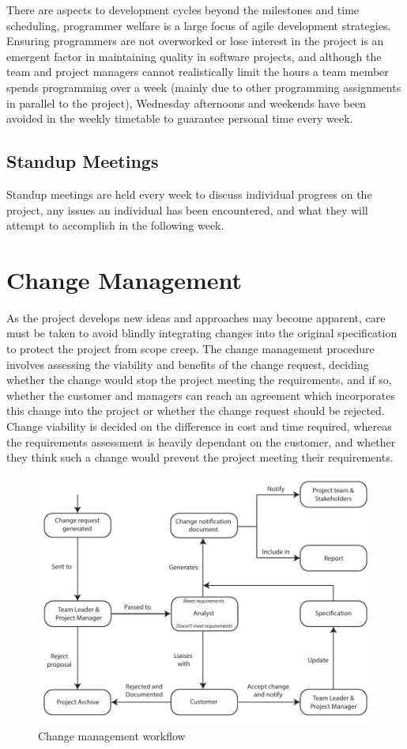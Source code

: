 There are aspects to development cycles beyond the milestones and time scheduling, programmer welfare is a large focus of agile development strategies. Ensuring programmers are not overworked or lose interest in the project is an emergent factor in maintaining quality in software projects, and although the team and project managers cannot realistically limit the hours a team member spends programming over a week (mainly due to other programming assignments in parallel to the project), Wednesday afternoons and weekends have been avoided in the weekly timetable to guarantee personal time every week.

\subsection{Standup Meetings}
Standup meetings are held every week to discuss individual progress on the project, any issues an individual has been encountered, and what they will attempt to accomplish in the following week.

\section{Change Management}
As the project develops new ideas and approaches may become apparent, care must be taken to avoid blindly integrating changes into the original specification to protect the project from scope creep. The change management procedure involves assessing the viability and benefits of the change request, deciding whether the change would stop the project meeting the requirements, and if so, whether the customer and managers can reach an agreement which incorporates this change into the project or whether the change request should be rejected. Change viability is decided on the difference in cost and time required, whereas the requirements assessment is heavily dependant on the customer, and whether they think such a change would prevent the project meeting their requirements.

\begin{figure}[h!]
	\includegraphics{"res/Change management diagram"}
	\caption{Change management workflow}
\end{figure}


